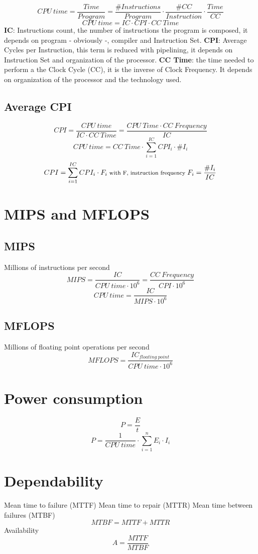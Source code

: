 \documentclass[12pt]{article}
\begin{document}
    \[CPU\:time = \frac{Time}{Program} = \frac{\#Instructions}{Program} \cdot \frac{\#CC}{Instruction} \cdot \frac{Time}{CC}\]
    \[CPU\:time = IC \cdot CPI \cdot CC\:Time\]
    \newline
    \textbf{IC}: Instructions count, the number of instructions the program is composed, it depends on  program - obviously -, compiler and Instruction Set.
    \newline\newline
    \textbf{CPI}: Average Cycles per Instruction, this term is reduced with pipelining, it depends on Instruction Set and organization of the processor.
    \newline\newline
    \textbf{CC Time}: the time needed to perform a the Clock Cycle (CC), it is the inverse of Clock Frequency. It depends on organization of the processor and the technology used.


    \subsection{Average CPI}
    \[CPI = \frac{CPU\:time}{IC \cdot CC\:Time} = \frac{CPU\:Time\cdot CC\:Frequency}{IC}\]
    \[CPU\:time = CC\:Time \cdot \sum_{i=1}^{IC}{CPI_i \cdot \#I_i}\]
    \[CPI = \sum_{i=1}^{IC}{CPI_i \cdot F_i} \text{\footnotesize{    with F, instruction frequency   }} F_i = \frac{\#I_i}{IC}\]

\section{MIPS and MFLOPS}
    \subsection{MIPS}
    Millions of instructions per second
    \[MIPS = \frac{IC}{CPU\:time\cdot 10^6} = \frac{CC\:Frequency}{CPI \cdot 10^6}\]
    \[CPU\:time = \frac{IC}{MIPS\cdot 10^6} \]
    \subsection{MFLOPS}
    Millions of floating point operations per second
    \[MFLOPS = \frac{IC_{floating\:point}}{CPU\:time\cdot 10^6} \]

\section{Power consumption}
    \[P = \frac{E}{t}\]
    \[P = \frac{1}{CPU\:time}\cdot\sum_{i=1}^{n}{E_i \cdot I_i}\]

\section{Dependability}
    Mean time to failure (MTTF)\newline
    Mean time to repair (MTTR)\newline
    Mean time between failures (MTBF) \[MTBF = MTTF + MTTR\]
    Availability \[A = \frac{MTTF}{MTBF}\]
\end{document}
